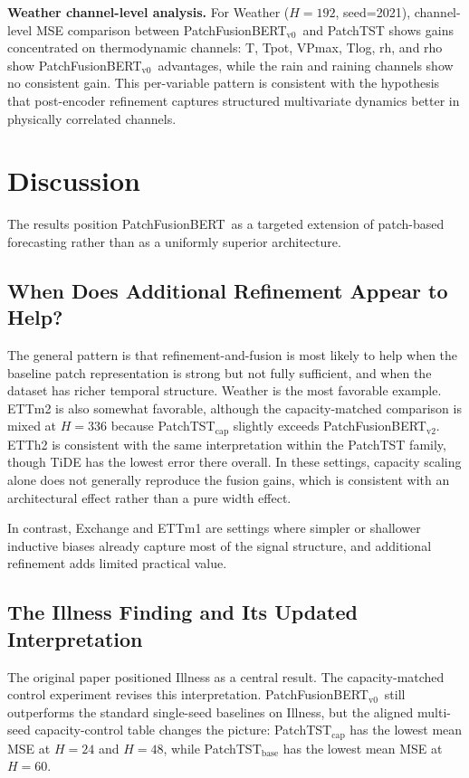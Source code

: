 \documentclass{ieeeaccess}
\newcommand{\model}{PatchFusionBERT\xspace}
\newcommand{\modelvzero}{PatchFusionBERT$_{\text{v0}}$\xspace}
\newcommand{\modelvtwo}{PatchFusionBERT$_{\text{v2}}$\xspace}
\begin{document}
\textbf{Weather channel-level analysis.}
For Weather ($H=192$, seed=2021), channel-level MSE comparison between \modelvzero\
and PatchTST shows gains concentrated on thermodynamic channels: T, Tpot, VPmax,
Tlog, rh, and rho show \modelvzero\ advantages, while the rain and raining channels
show no consistent gain. This per-variable pattern is consistent with the hypothesis
that post-encoder refinement captures structured multivariate dynamics better in
physically correlated channels.


\section{Discussion}\label{sec:discussion}

The results position \model\ as a targeted extension of patch-based forecasting
rather than as a uniformly superior architecture.

\subsection{When Does Additional Refinement Appear to Help?}
The general pattern is that refinement-and-fusion is most likely to help when the baseline
patch representation is strong but not fully sufficient, and when the dataset has
richer temporal structure. Weather is the most favorable example. ETTm2 is also
somewhat favorable, although the capacity-matched comparison is mixed at $H=336$ because
PatchTST$_\text{cap}$ slightly exceeds \modelvtwo. ETTh2 is consistent with the same interpretation
within the PatchTST family, though TiDE has the lowest error there overall. In
these settings, capacity scaling alone does not generally reproduce the fusion gains,
which is consistent with an architectural effect rather than a pure width
effect.

In contrast, Exchange and ETTm1 are settings where simpler or shallower inductive
biases already capture most of the signal structure, and additional refinement adds
limited practical value.

\subsection{The Illness Finding and Its Updated Interpretation}
The original paper positioned Illness as a central result. The capacity-matched
control experiment revises this interpretation. \modelvzero\ still outperforms the
standard single-seed baselines on Illness, but the aligned multi-seed
capacity-control table changes the picture: PatchTST$_\text{cap}$ has the lowest mean MSE at
$H=24$ and $H=48$, while PatchTST$_\text{base}$ has the lowest mean MSE at $H=60$.
\end{document}
